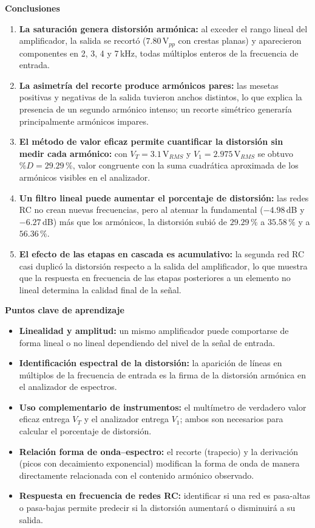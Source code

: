\documentclass[12pt]{article}
\begin{document}
\textbf{Conclusiones}

\begin{enumerate}[label=\arabic*.]
    \item \textbf{La saturación genera distorsión armónica:} al exceder el rango lineal del amplificador, la salida se recortó ($7.80$\,V$_{pp}$ con crestas planas) y aparecieron componentes en 2, 3, 4 y 7\,kHz, todas múltiplos enteros de la frecuencia de entrada.
    \item \textbf{La asimetría del recorte produce armónicos pares:} las mesetas positivas y negativas de la salida tuvieron anchos distintos, lo que explica la presencia de un segundo armónico intenso; un recorte simétrico generaría principalmente armónicos impares.
    \item \textbf{El método de valor eficaz permite cuantificar la distorsión sin medir cada armónico:} con $V_T = 3.1$\,V$_{RMS}$ y $V_1 = 2.975$\,V$_{RMS}$ se obtuvo $\%D = 29.29\,\%$, valor congruente con la suma cuadrática aproximada de los armónicos visibles en el analizador.
    \item \textbf{Un filtro lineal puede aumentar el porcentaje de distorsión:} las redes RC no crean nuevas frecuencias, pero al atenuar la fundamental ($-4.98$\,dB y $-6.27$\,dB) más que los armónicos, la distorsión subió de $29.29\,\%$ a $35.58\,\%$ y a $56.36\,\%$.
    \item \textbf{El efecto de las etapas en cascada es acumulativo:} la segunda red RC casi duplicó la distorsión respecto a la salida del amplificador, lo que muestra que la respuesta en frecuencia de las etapas posteriores a un elemento no lineal determina la calidad final de la señal.
\end{enumerate}

\textbf{Puntos clave de aprendizaje}

\begin{itemize}[label=--]
    \item \textbf{Linealidad y amplitud:} un mismo amplificador puede comportarse de forma lineal o no lineal dependiendo del nivel de la señal de entrada.
    \item \textbf{Identificación espectral de la distorsión:} la aparición de líneas en múltiplos de la frecuencia de entrada es la firma de la distorsión armónica en el analizador de espectros.
    \item \textbf{Uso complementario de instrumentos:} el multímetro de verdadero valor eficaz entrega $V_T$ y el analizador entrega $V_1$; ambos son necesarios para calcular el porcentaje de distorsión.
    \item \textbf{Relación forma de onda--espectro:} el recorte (trapecio) y la derivación (picos con decaimiento exponencial) modifican la forma de onda de manera directamente relacionada con el contenido armónico observado.
    \item \textbf{Respuesta en frecuencia de redes RC:} identificar si una red es pasa-altas o pasa-bajas permite predecir si la distorsión aumentará o disminuirá a su salida.
\end{itemize}
\end{document}
